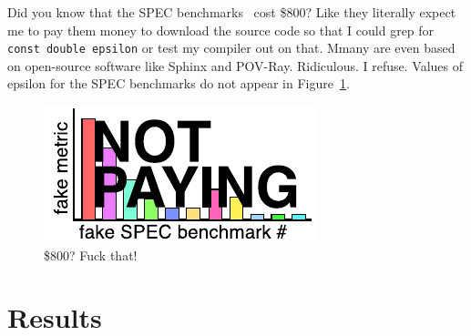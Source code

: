 \documentclass[twocolumn]{article}
\begin{document}
Did you know that the SPEC benchmarks~\cite{spec2006} cost \$800? Like
they literally expect me to pay them money to download the source code
so that I could grep for {\tt const double epsilon} or test my
compiler out on that. Mmany are even based on open-source software like
Sphinx and POV-Ray. Ridiculous. I refuse. Values of epsilon for the
SPEC benchmarks do not appear in Figure~\ref{fig:spec}.

\begin{figure}[ht]
\begin{center}
\includegraphics[width=0.99 \linewidth]{spec.pdf}
\end{center}\vspace{-0.1in}
\caption{\$800? Fuck that!}
\label{fig:spec}
\end{figure}



\section{Results}
\end{document}
